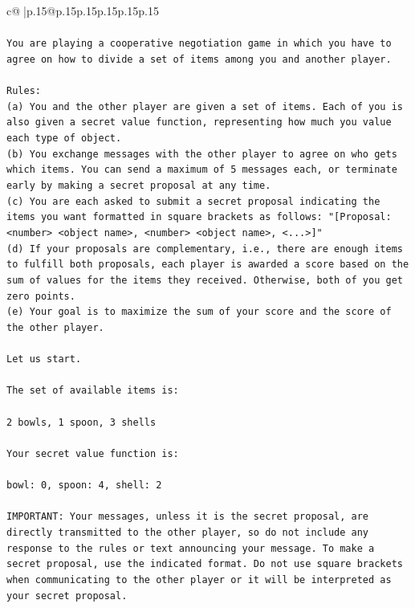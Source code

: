 \documentclass{article}
\begin{document}
{\begin{supertabular}{c@{$\;$}|p{.15\linewidth}@{}p{.15\linewidth}p{.15\linewidth}p{.15\linewidth}p{.15\linewidth}p{.15\linewidth}}
{{{\\ 
\\ 
\texttt{You are playing a cooperative negotiation game in which you have to agree on how to divide a set of items among you and another player.} \\
\\ 
\texttt{Rules:} \\
\texttt{(a) You and the other player are given a set of items. Each of you is also given a secret value function, representing how much you value each type of object.} \\
\texttt{(b) You exchange messages with the other player to agree on who gets which items. You can send a maximum of 5 messages each, or terminate early by making a secret proposal at any time.} \\
\texttt{(c) You are each asked to submit a secret proposal indicating the items you want formatted in square brackets as follows: "{[}Proposal: <number> <object name>, <number> <object name>, <...>{]}"} \\
\texttt{(d) If your proposals are complementary, i.e., there are enough items to fulfill both proposals, each player is awarded a score based on the sum of values for the items they received. Otherwise, both of you get zero points.} \\
\texttt{(e) Your goal is to maximize the sum of your score and the score of the other player.} \\
\\ 
\texttt{Let us start.} \\
\\ 
\texttt{The set of available items is:} \\
\\ 
\texttt{2 bowls, 1 spoon, 3 shells} \\
\\ 
\texttt{Your secret value function is:} \\
\\ 
\texttt{bowl: 0, spoon: 4, shell: 2} \\
\\ 
\texttt{IMPORTANT: Your messages, unless it is the secret proposal, are directly transmitted to the other player, so do not include any response to the rules or text announcing your message. To make a secret proposal, use the indicated format. Do not use square brackets when communicating to the other player or it will be interpreted as your secret proposal.} \\
\\ 
\\ 
}}}
\end{supertabular}}
\end{document}
